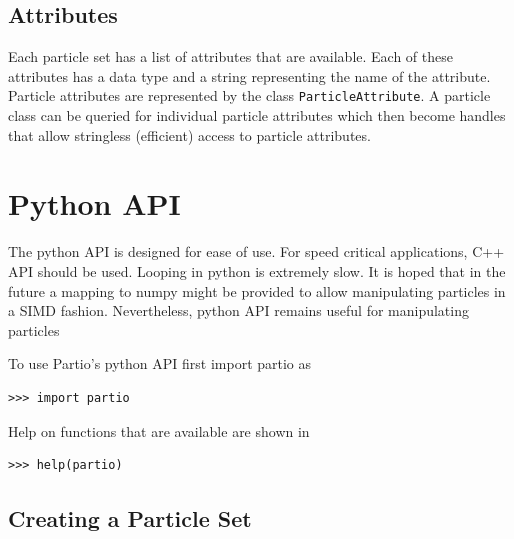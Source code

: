 \documentclass{article}
\begin{document}
\subsection{Attributes}

Each particle set has a list of attributes that are available. Each of these attributes has a data type and a string representing the name of the attribute.  Particle attributes are
represented by the class \verb|ParticleAttribute|.  A particle class can be queried for individual particle attributes which then become handles that allow stringless (efficient) access to
particle attributes.

\section{Python API}

The python API is designed for ease of use. For speed critical applications, C++ API should be used.  Looping in python is extremely slow.  It is hoped that in the future a mapping to numpy
might be provided to allow manipulating particles in a SIMD fashion.  Nevertheless, python API remains useful for manipulating particles

To use Partio's python API first import partio as
\begin{verbatim}
>>> import partio
\end{verbatim}
Help on functions that are available are shown in 
\begin{verbatim}
>>> help(partio)
\end{verbatim}

\subsection{Creating a Particle Set}
\end{document}
